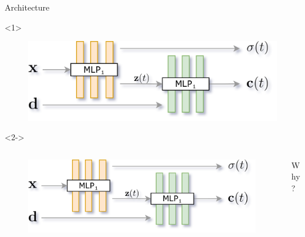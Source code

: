 \documentclass[aspectratio=1610]{beamer}
\begin{document}
\begin{frame}{Architecture}
    \begin{onlyenv}<1>
        \begin{figure}[H]
            \centering
            \includegraphics[width=.8\textwidth]{nerf-architecture}
        \end{figure}
    \end{onlyenv}

    \pause
    
    \begin{onlyenv}<2->
        \begin{columns}
            \begin{column}{.7\textwidth}
                \begin{figure}[H]
                    \centering
                    \includegraphics[width=.65\textwidth]{nerf-architecture}
                \end{figure}
            \end{column}
            \begin{column}{.3\textwidth}
                \Large{Why?}
            \end{column}
        \end{columns}
        \vspace{1.2cm}

        \pause


\end{onlyenv}
\end{frame}
\end{document}
